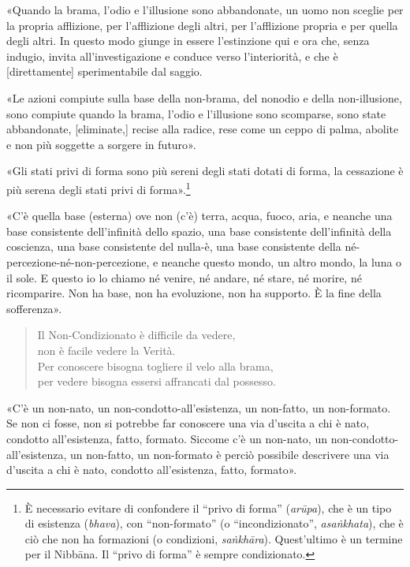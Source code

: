 

«Quando la brama, l’odio e l’illusione sono abbandonate, un uomo non
sceglie per la propria afflizione, per l’afflizione degli altri, per
l’afflizione propria e per quella degli altri. In questo modo giunge in
essere l’estinzione qui e ora che, senza indugio, invita
all’investigazione e conduce verso l’interiorità, e che è [direttamente]
sperimentabile dal saggio.




«Le azioni compiute sulla base della non-brama, del nonodio e della
non-illusione, sono compiute quando la brama, l’odio e l’illusione sono
scomparse, sono state abbandonate, [eliminate,] recise alla radice, rese
come un ceppo di palma, abolite e non più soggette a sorgere in futuro».




«Gli stati privi di forma sono più sereni degli stati dotati di forma,
la cessazione è più serena degli stati privi di
forma».\footnote{È necessario evitare di confondere il “privo di forma” (\emph{arūpa}), che è un tipo di esistenza (\emph{bhava}), con “non-formato” (o “incondizionato”, \emph{asaṅkhata}), che è ciò che non ha formazioni (o condizioni, \emph{saṅkhāra}). Quest’ultimo è un termine per il Nibbāna. Il “privo di forma” è sempre condizionato.}




«C’è quella base (esterna) ove non (c’è) terra, acqua, fuoco, aria, e
neanche una base consistente dell’infinità dello spazio, una base
consistente dell’infinità della coscienza, una base consistente del
nulla-è, una base consistente della né-percezione-né-non-percezione, e
neanche questo mondo, un altro mondo, la luna o il sole. E questo io lo
chiamo né venire, né andare, né stare, né morire, né ricomparire. Non ha
base, non ha evoluzione, non ha supporto. È la fine della sofferenza».


\begin{quote}
Il Non-Condizionato è difficile da vedere, \\
non è facile vedere la Verità. \\
Per conoscere bisogna togliere il velo alla brama, \\
per vedere bisogna essersi affrancati dal possesso.
\end{quote}

«C’è un non-nato, un non-condotto-all’esistenza, un non-fatto, un
non-formato. Se non ci fosse, non si potrebbe far conoscere una via
d’uscita a chi è nato, condotto all’esistenza, fatto, formato. Siccome
c’è un non-nato, un non-condotto-all’esistenza, un non-fatto, un
non-formato è perciò possibile descrivere una via d’uscita a chi è nato,
condotto all’esistenza, fatto, formato».



